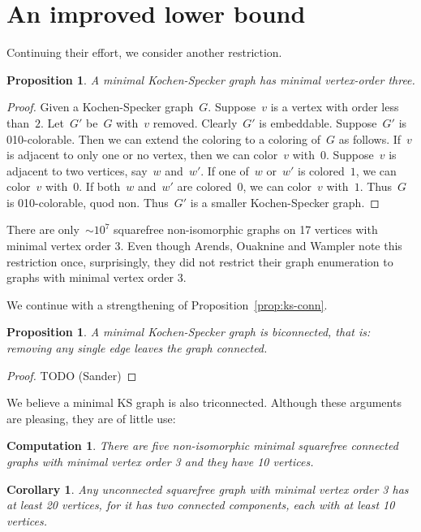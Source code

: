 \documentclass[a4paper]{article}
\newcounter{main}
\newtheorem{prop}[main]{Proposition}
\newtheorem{comp}[main]{Computation}
\newtheorem{cor}[main]{Corollary}
\theoremstyle{definition}
\theoremstyle{remark}
\begin{document}
\section{An improved lower bound}
Continuing their effort, we consider another restriction.
\begin{prop}
    A minimal Kochen-Specker graph has minimal vertex-order three.
\end{prop}
\begin{proof}
    Given a Kochen-Specker graph~$G$.
    Suppose~$v$ is a vertex with order less than~$2$.
    Let~$G'$ be~$G$ with~$v$ removed.
    Clearly~$G'$ is embeddable.
    Suppose~$G'$ is 010-colorable.
    Then we can extend the coloring to a coloring of~$G$ as follows.
    If~$v$ is adjacent to only one or no vertex,
    then we can color~$v$ with~$0$.
    Suppose~$v$ is adjacent to two vertices, say~$w$ and~$w'$.
    If one of~$w$ or~$w'$ is colored~$1$, we can color~$v$ with~$0$.
    If both~$w$ and~$w'$ are colored~$0$, we can color~$v$ with~$1$.
    Thus~$G$ is 010-colorable, quod non.  Thus~$G'$ is a smaller
    Kochen-Specker graph.
\end{proof}
There are only~${\sim}10^7$
squarefree non-isomorphic graphs on 17 vertices with minimal vertex order 3.
Even though Arends, Ouaknine and Wampler
note this restriction once,
surprisingly, they did not restrict their graph enumeration
to graphs with minimal vertex order 3.

We continue with a strengthening of Proposition~\ref{prop:ks-conn}.
\begin{prop}
A minimal Kochen-Specker graph is biconnected,
that is: removing any single edge leaves the graph connected.
\end{prop}
\begin{proof}
    TODO (Sander)
\end{proof}
We believe a minimal KS graph is also triconnected.
Although these arguments are pleasing,
they are of little use:
\begin{comp}
    There are five non-isomorphic minimal
    squarefree connected graphs
    with minimal vertex order 3 and they have 10 vertices.
\end{comp}
\begin{cor}
    Any unconnected
    squarefree graph with minimal vertex order 3
    has at least 20 vertices, for it has two connected components,
    each with at least 10 vertices.
\end{cor}
\end{document}
